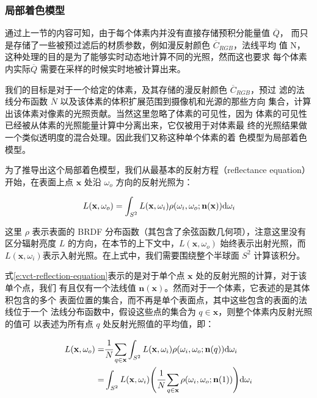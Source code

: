 \subsubsection{局部着色模型}\label{sec:vct-local-shading}
通过上一节的内容可知，由于每个体素内并没有直接存储预积分能量值 $\overline{Q}$， 而只是存储了一些被预过滤后的材质参数，例如漫反射颜色 $\overline{C}_{RGB}$，法线平均 值 N，这种处理的目的是为了能够实时动态地计算不同的光照，然而这也要求 每个体素内实际$\overline{Q}$ 需要在采样的时候实时地被计算出来。

我们的目标是对于一个给定的体素，及其存储的漫反射颜色 $\overline{C}_{RGB}$，预过 滤的法线分布函数 $\overline{N}$ 以及该体素的体积扩展范围到摄像机和光源的那些方向 集合，计算出该体素对像素的光照贡献。当然这里忽略了体素的可见性，因为 体素的可见性已经被从体素的光照能量计算中分离出来，它仅被用于对体素最 终的光照结果做一个类似透明度的混合处理。因此我们又称这种单个体素的着 色模型为局部着色模型。

为了推导出这个局部着色模型，我们从最基本的反射方程（reflectance equation）开始，在表面上点 $\mathbf{x}$ 处沿 $\omega_o$ 方向的反射光照为：


\begin{equation}\label{e:vct-reflection-equation}
	L(\mathbf{x},\omega_o)=\int_{S^{2}}L(\mathbf{x},\omega_i)\rho(\omega_i,\omega_o;\mathbf{n}(\mathbf{x})){\rm d}\omega_i
\end{equation}

这里 $\rho$ 表示表面的 BRDF 分布函数（其包含了余弦函数几何项），注意这里没有区分辐射亮度 $L$ 的方向，在本节的上下文中，$L(\mathbf{x},\omega_o)$ 始终表示出射光照，而 $L(\mathbf{x},\omega_i)$表示入射光照。在上式中，我们需要围绕整个半球面 $S^{2}$ 计算该积分。

式\ref{e:vct-reflection-equation}表示的是对于单个点 $\mathbf{x}$ 处的反射光照的计算，对于该单个点，我们 有且仅有一个法线值 $\mathbf{n}(\mathbf{x})$。然而对于一个体素，它表述的是其体积包含的多个 表面位置的集合，而不再是单个表面点，其中这些包含的表面的法线位于一个 法线分布函数中，假设这些点的集合为 $q \in \mathbf{x}$，则整个体素内反射光照的值可 以表述为所有点 $q$ 处反射光照值的平均值，即：

\begin{equation}\label{e:vct-reflection-equation-1}
\begin{aligned}
	L(\mathbf{x},\omega_o)=&\cfrac{1}{N}\sum_{q\in \mathbf{x}}\int_{S^{2}}L(\mathbf{x},\omega_i)\rho(\omega_i,\omega_o;\mathbf{n}(q)){\rm d}\omega_i\\
	=&\int_{S^{2}}L(\mathbf{x},\omega_i)\Biggl(\cfrac{1}{N}\sum_{q\in \mathbf{x}}\rho(\omega_i,\omega_o;\mathbf{n}(1))\Biggl){\rm d}\omega_i
\end{aligned}
\end{equation}


